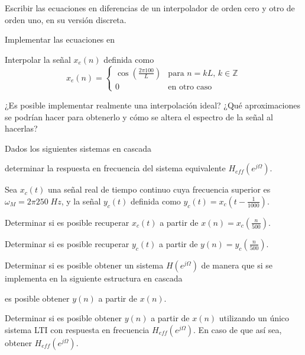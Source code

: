     \begin{ejercicio}
    Escribir las ecuaciones en diferencias de un interpolador de orden cero y otro de orden uno, en su versión discreta. 
    
    \inciso Implementar las ecuaciones en \Keyboardsym
    
    \inciso Interpolar la señal $x_e(n)$ definida como
    \begin{equation*}
        x_e(n) = \begin{cases}
        \cos(\frac{2\pi100}{L}) & \mbox{para $n=kL$, $k\in \mathbb{Z}$} \\
        0 & \mbox{en otro caso}
        \end{cases}
    \end{equation*}
    
    \inciso ¿Es posible implementar realmente una interpolación ideal? ¿Qué aproximaciones se podrían hacer para obtenerlo y cómo se altera el espectro de la señal al hacerlas?
    \end{ejercicio}
    
    \begin{ejercicio}
    Dados los siguientes sistemas en cascada
    \begin{center}
        
    \end{center}
    determinar la respuesta en frecuencia del sistema equivalente $H_{eff}(e^{j\Omega})$.
    \end{ejercicio}
    
    \begin{ejercicio}
    Sea $x_c(t)$ una señal real de tiempo continuo cuya frecuencia superior es $\omega_M = 2\pi 250\mathrm\;{Hz}$, y la señal $y_c(t)$ definida como $y_c(t) = x_c(t - \frac{1}{1000})$.
    
    \inciso Determinar si es posible recuperar $x_c(t)$ a partir de $x(n)=x_c(\frac{n}{500})$.
    
    \inciso Determinar si es posible recuperar $y_c(t)$ a partir de $y(n)=y_c(\frac{n}{500})$.
    
    \inciso Determinar si es posible obtener un sistema $H(e^{j\Omega})$ de manera que si se implementa en la siguiente estructura en cascada
    \begin{center}
        
    \end{center}
    es posible obtener $y(n)$ a partir de $x(n)$.
    
    \inciso Determinar si es posible obtener $y(n)$ a partir de $x(n)$ utilizando un único sistema LTI con respuesta en frecuencia $H_{eff}(e^{j\Omega})$. En caso de que así sea, obtener $H_{eff}(e^{j\Omega})$.
    
    \end{ejercicio}